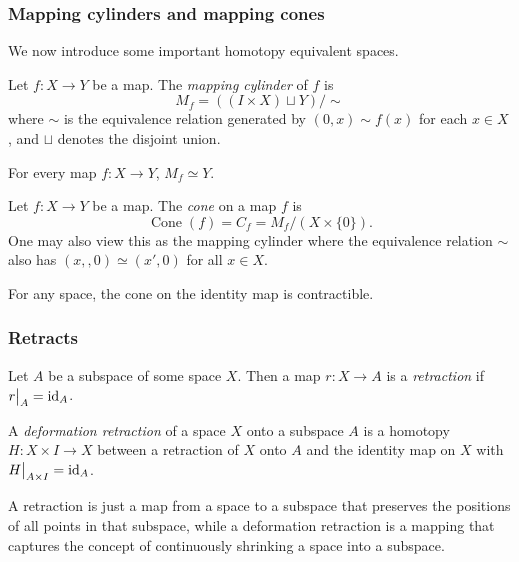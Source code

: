 \subsubsection{Mapping cylinders and mapping cones}

We now introduce some important homotopy equivalent spaces.

\begin{definition}
	Let $f: X \to Y$ be a map. The \emph{mapping cylinder} of $f$ is
	\[M_f = ((I\times X)\sqcup Y)/{\sim}\]
	where $\sim$ is the equivalence relation generated by $(0,x) \sim f(x)$ for each $x \in X$, and $\sqcup$ denotes the disjoint union.
\end{definition}

\begin{lemma}
	For every map $f: X \to Y$, $M_f \simeq Y$.
\end{lemma}

\begin{definition}[Cone]
	Let $f: X \to Y$ be a map. The \emph{cone} on a map $f$ is
	\[\operatorname{Cone}(f) = C_f = M_f/(X \times \{0\}).\]
	One may also view this as the mapping cylinder where the equivalence relation $\sim$ also has $(x,, 0) \simeq (x', 0)$ for all $x \in X$.
\end{definition}

\begin{lemma}
	For any space, the cone on the identity map is contractible.
\end{lemma}

\subsubsection{Retracts}

\begin{definition}[Retract]
	Let $A$ be a subspace of some space $X$. Then a map $r: X \to A$ is a \emph{retraction} if $\restr rA = \id_A$.
\end{definition}



\begin{definition}
	A \emph{deformation retraction} of a space $X$ onto a subspace $A$ is a homotopy $H: X \times I \to X$ between a retraction of $X$ onto $A$ and the identity map on $X$ with $\restr{H}{A \times I} = \id_A$.
\end{definition}

A retraction is just a map from a space to a subspace that preserves the positions of all points in that subspace, while a deformation retraction is a mapping that captures the concept of continuously shrinking a space into a subspace.


